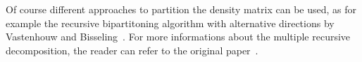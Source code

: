 \documentclass[prl,preprint,doublespace]{revtex4} %
\begin{document}
 
 Of course different approaches to partition the density matrix can be 
 used, as for example the recursive bipartitoning algorithm with
 alternative directions by Vastenhouw and Bisseling~\cite{BVastenhouw}.
 For more informations about the multiple recursive decomposition, the reader can refer 
 to the original paper~\cite{LRomero95}.
\end{document}
